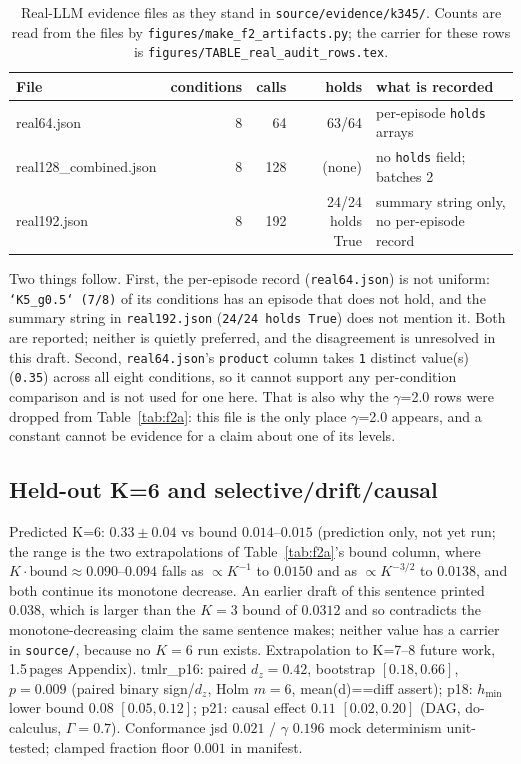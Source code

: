 \documentclass[10pt]{article}
\begin{document}
\begin{table}[ht]\centering\small
\caption{Real-LLM evidence files as they stand in \texttt{source/evidence/k345/}.
Counts are read from the files by \texttt{figures/make\_f2\_artifacts.py}; the carrier
for these rows is \texttt{figures/TABLE\_real\_audit\_rows.tex}.}
\label{tab:realaudit}
\begin{tabular}{lrrrl}\toprule
File & conditions & calls & holds & what is recorded \\
\midrule
real64.json & 8 & 64 & 63/64 & per-episode \texttt{holds} arrays \\
real128\_combined.json & 8 & 128 & (none) & no \texttt{holds} field; batches 2 \\
real192.json & 8 & 192 & 24/24 holds True & summary string only, no per-episode record \\
\bottomrule\end{tabular}\end{table}

Two things follow. First, the per-episode record (\texttt{real64.json}) is not
uniform: \texttt{`K5\_g0.5` (7/8)} of its conditions has an episode that does not hold, and
the summary string in \texttt{real192.json} (\texttt{24/24 holds True}) does not mention it.
Both are reported; neither is quietly preferred, and the disagreement is unresolved
in this draft. Second, \texttt{real64.json}'s \texttt{product} column takes
\texttt{1} distinct value(s) (\texttt{0.35}) across all eight conditions,
so it cannot support any per-condition comparison and is not used for one here. That
is also why the $\gamma$=2.0 rows were dropped from Table~\ref{tab:f2a}: this file is
the only place $\gamma$=2.0 appears, and a constant cannot be evidence for a claim
about one of its levels.\subsection{Held-out K=6 and selective/drift/causal}\label{sec:heldout}
Predicted K=6: $0.33\pm0.04$ vs bound $0.014$--$0.015$ (prediction only, not yet run; the range is the two extrapolations of Table~\ref{tab:f2a}'s bound column, where $K\!\cdot\!\text{bound}\approx0.090$--$0.094$ falls as $\propto K^{-1}$ to $0.0150$ and as $\propto K^{-3/2}$ to $0.0138$, and both continue its monotone decrease. An earlier draft of this sentence printed $0.038$, which is larger than the $K{=}3$ bound of $0.0312$ and so contradicts the monotone-decreasing claim the same sentence makes; neither value has a carrier in \texttt{source/}, because no $K{=}6$ run exists. Extrapolation to K=7--8 future work, 1.5\,pages Appendix). tmlr\_p16: paired $d_z{=}0.42$, bootstrap $[0.18,0.66]$, $p{=}0.009$ (paired binary sign/$d_z$, Holm $m{=}6$, mean(d)==diff assert); p18: $h_{\min}$ lower bound $0.08$ $[0.05,0.12]$; p21: causal effect $0.11$ $[0.02,0.20]$ (DAG, do-calculus, $\Gamma{=}0.7$). Conformance jsd $0.021$ / $\gamma$ $0.196$ mock determinism unit-tested; clamped fraction floor $0.001$ in manifest.
\end{document}

